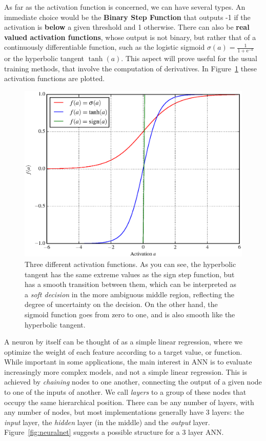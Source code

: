 As far as the activation function is concerned, we can have several types. An immediate choice would be the \textbf{Binary Step Function} that  outputs -1 if the activation is \textbf{below} a given threshold and 1 otherwise. There can also be \textbf{real valued activation functions}, whose output is not binary, but rather that of a continuously differentiable function, such as the logistic sigmoid $\sigma(a) = \frac{1}{1 + \mathrm{e}^{-a}}$ or the hyperbolic tangent $\tanh(a)$. This aspect will prove useful for the usual training methods, that involve the computation of derivatives. In Figure~\ref{fig:activFunc} these activation functions are plotted.

\begin{figure}[H]
	\centering
	\includegraphics[width=0.9\linewidth]{figures/activFunc.eps}
    \caption[Possible activation functions of choice for a neuron]{Three different activation functions. As you can see, the hyperbolic tangent has the same extreme values as the sign step function, but has a smooth transition between them, which can be interpreted as a \emph{soft decision} in the more ambiguous middle region, reflecting the degree of uncertainty on the decision. On the other hand, the sigmoid function goes from zero to one, and is also smooth like the hyperbolic tangent.}
	\label{fig:activFunc}
\end{figure}


A neuron by itself can be thought of as a simple linear regression, where we optimize the weight of each feature according to a target value, or function. While important in some applications, the main interest in ANN is to evaluate increasingly more complex models, and not a simple linear regression. This is achieved by \emph{chaining} nodes to one another, connecting the output of a given node to one of the inputs of another. We call \emph{layers} to a group of these nodes that occupy the same hierarchical position. There can be any number of layers, with any number of nodes, but most implementations generally have 3 layers: the \emph{input} layer, the \emph{hidden} layer (in the middle) and the \emph{output} layer. Figure~\ref{fig:neuralnet} suggests a possible structure for a 3 layer ANN. 


